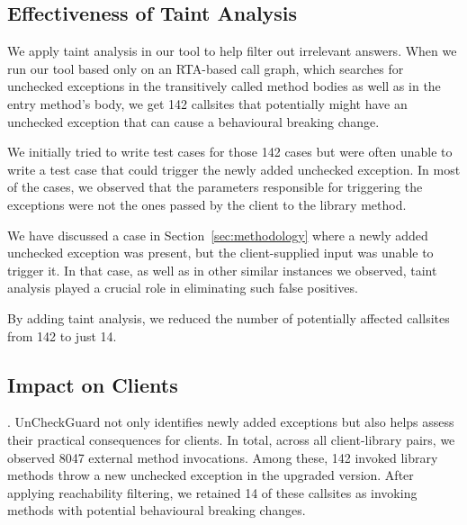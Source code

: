 \subsection{Effectiveness of Taint Analysis}

We apply taint analysis in our tool to help filter out irrelevant answers. When we run our tool based only on an RTA-based call graph, which
searches for unchecked exceptions in the transitively called method bodies as well as in the entry method's body, we get
142 callsites that potentially might have an unchecked exception that can cause a behavioural breaking change.

We initially tried to write test cases for those 142 cases but were often unable to write a test case that could trigger
the newly added unchecked exception. In most of the cases, we observed that the parameters responsible for triggering the 
exceptions were not the ones passed by the client to the library method.

We have discussed a case in Section~\ref{sec:methodology} where a newly added unchecked exception was present, but the client-supplied input was unable to trigger it. In that case, as well as in other similar instances we observed, taint analysis played a crucial role in eliminating such false positives.

\vspace{1em}
\begin{tcolorbox}[colback=gray!10, colframe=black]
By adding taint analysis, we reduced the number of potentially affected callsites from 142 to just 14.
\end{tcolorbox}
\vspace{1em}


\subsection{Impact on Clients}

.
UnCheckGuard not only identifies newly added exceptions but also helps assess their practical consequences for clients. In total, across all client-library pairs, we observed 8047 external method invocations. Among these, 142 invoked library methods throw a new unchecked exception in the upgraded version. After applying reachability filtering, we retained 14 of these callsites as invoking methods with potential behavioural breaking changes. 

